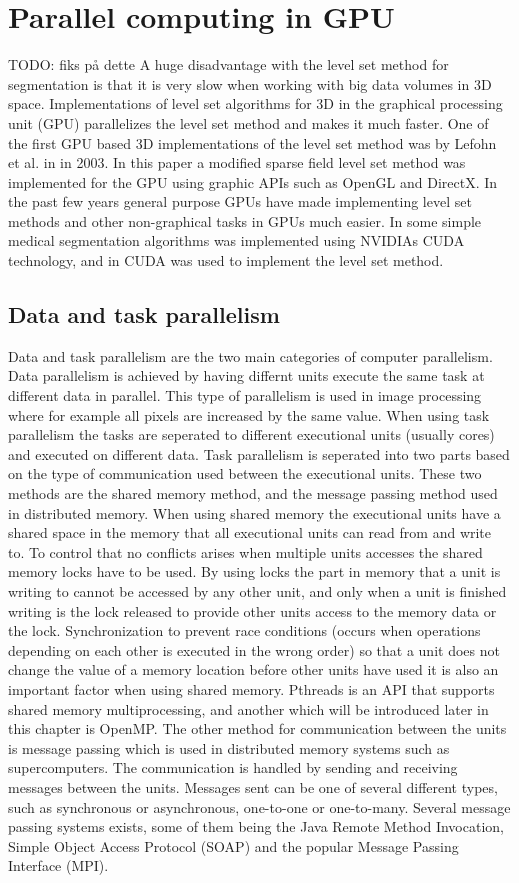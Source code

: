 \section{Parallel computing in GPU}
TODO: fiks på dette
A huge disadvantage with the level set method for segmentation is that it is very slow when working with big data volumes in 3D space. Implementations of level set algorithms for 3D in the graphical processing unit (GPU) parallelizes the level set method and makes it much faster. One of the first GPU based 3D implementations of the level set method was by Lefohn et al. in \cite{cates03} in 2003. In this paper a modified sparse field level set method was implemented for the GPU using graphic APIs such as OpenGL and DirectX. In the past few years general purpose GPUs have made implementing level set methods and other non-graphical tasks in GPUs much easier. In \cite{panlei08} some simple medical segmentation algorithms was implemented using NVIDIAs CUDA technology, and in \cite{Packer10} CUDA was used to implement the level set method.


\subsection{Data and task parallelism}
Data and task parallelism are the two main categories of computer parallelism. Data parallelism is achieved by having differnt units execute the same task at different data in parallel. This type of parallelism is used in image processing where for example all pixels are increased by the same value. 
When using task parallelism the tasks are seperated to different executional units (usually cores) and executed on different data. Task parallelism is seperated into two parts based on the type of communication used between the executional units. These two methods are the shared memory method, and the message passing method used in distributed memory. When using shared memory the executional units have a shared space in the memory that all executional units can read from and write to. To control that no conflicts arises when multiple units accesses the shared memory locks have to be used. By using locks the part in memory that a unit is writing to cannot be accessed by any other unit, and only when a unit is finished writing is the lock released to provide other units access to the memory data or the lock. Synchronization to prevent race conditions (occurs when operations depending on each other is executed in the wrong order) so that a unit does not change the value of a memory location before other units have used it is also an important factor when using shared memory. Pthreads is an API that supports shared memory multiprocessing, and another which will be introduced later in this chapter is OpenMP. The other method for communication between the units is message passing which is used in distributed memory systems such as supercomputers. The communication is handled by sending and receiving messages between the units. Messages sent can be one of several different types, such as synchronous or asynchronous, one-to-one or one-to-many. Several message passing systems exists, some of them being the Java Remote Method Invocation, Simple Object Access Protocol (SOAP) and the popular Message Passing Interface (MPI). 

